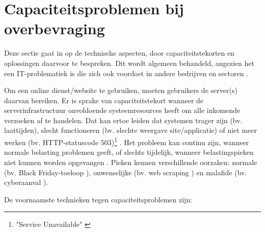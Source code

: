 
\section{Capaciteitsproblemen bij overbevraging}

Deze sectie gaat in op de technische aspecten,
door capaciteitstekorten en oplossingen daarvoor te bespreken.
Dit wordt algemeen behandeld,
angezien het een IT-problematiek is 
die zich ook voordoet in andere bedrijven en
sectoren \cite{warren2023chatgpt, warren2020discord, reuters2023what}.

Om een online dienst/website te gebruiken, moeten gebruikers de
server(s) daarvan bereiken. Er is sprake van
capaciteitstekort wanneer de serverinfrastructuur onvoldoende systeemresources
heeft om alle inkomende verzoeken af te handelen.
Dat kan ertoe leiden dat systemen trager zijn (bv. laattijden),
slecht functioneren (bv. slechte weergave site/applicatie) of
niet meer werken (bv. HTTP-statuscode
503)\footnote{"Service Unavailable" \cite{fielding2022http}}
\cite{guitart2010survey, guitart2007designing}.
Het probleem kan continu zijn, wanneer normale belasting problemen
geeft, of slechts tijdelijk, wanneer belastingspieken niet kunnen worden
opgevangen \cite{schroeder2006web}. Pieken kennen verschillende oorzaken:
normale (bv. Black Friday-toeloop \cite{iyer2001overload}),
onwenselijke (bv. web scraping \cite{thelwall2006web}) en
malafide (bv. cyberaanval \cite{loukas2009protection}).

De voornaamste technieken tegen capaciteitsproblemen zijn:

